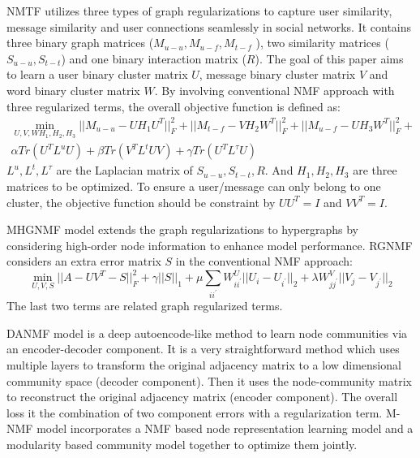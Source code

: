 NMTF \cite{pei2015nonnegative} utilizes three types of graph regularizations to capture user similarity, message similarity and user connections seamlessly in social networks. It contains three binary graph matrices ($M_{u-u},M_{u-f}, M_{t-f}$ ), two similarity matrices ($S_{u-u},S_{t-t}$) and one binary interaction matrix ($R$). The goal of this paper aims to learn a user binary cluster matrix $U$, message binary cluster matrix $V$ and word binary cluster matrix $W$. By involving conventional NMF approach with three regularized terms, the overall objective function is defined as:
\begin{equation}
\begin{aligned}
\min_{U,V,WH_1,H_2,H_3}||M_{u-u}-UH_1U^T||^2_F + ||M_{t-f}-VH_2W^T||^2_F + ||M_{u-f}-UH_3W^T||^2_F + \\
\alpha Tr(U^TL^uU)+\beta Tr(V^TL^tUV) + \gamma  Tr(U^TL^\tau U)
\end{aligned}
\end{equation}
$L^u,L^t,L^\tau$ are the Laplacian matrix of $S_{u-u},S_{t-t},R$. And $H_1,H_2,H_3$ are three matrices to be optimized. To ensure a user/message can only belong to one cluster, the objective function should be constraint by $UU^T=I$ and $VV^T=I$.

MHGNMF model \cite{wu2018nonnegative} extends the graph regularizations to hypergraphs by considering high-order node information to enhance model performance. RGNMF \cite{huang2018robust} considers an extra error matrix $S$ in the conventional NMF approach:
\begin{equation}
\min_{U,V,S} ||A-UV^T -S||^2_F + \gamma ||S||_1 + \mu \sum_{ii^{'}}  W^U_{ii^{'}}||U_i-U_{i^{'}}||_2 + \lambda W_{jj^{'}}^V||V_j-V_{j^{'}}||_2
\end{equation} 
The last two terms are related graph regularized terms. 

DANMF model \cite{ye2018deep} is a deep autoencode-like method to learn node communities via an encoder-decoder component. It is a very straightforward method which uses multiple layers to transform the original adjacency matrix to a low dimensional community space (decoder component). Then it uses the node-community matrix to reconstruct the original adjacency matrix (encoder component). The overall loss it the combination of two component errors with a regularization term. M-NMF model \cite{wang2017community} incorporates a NMF based node representation learning model and a modularity based community model together to optimize them jointly.

